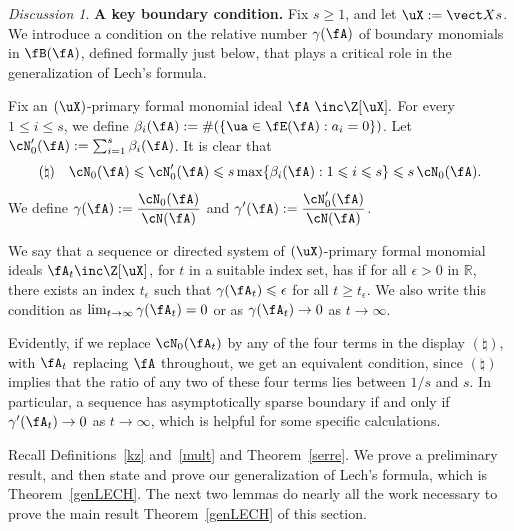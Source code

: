 \documentclass[12pt]{amsart}
\theoremstyle{plain}
\theoremstyle{remark}
\newtheorem{discussion}[theorem]{Discussion}
\theoremstyle{definition}
\numberwithin{equation}{theorem}
\renewcommand{\geq}{\geqslant} \renewcommand{\leq}{\leqslant}
\begin{document}
\begin{discussion}\label{boundary}{\bf A key boundary condition.} 
Fix $s \geq 1$, and let $\uX : = \vect X s$.  We introduce a 
condition on the relative number $\gamma(\fA)$
of boundary monomials in $\fB(\fA)$, defined formally just below,
that plays a critical role in the generalization of Lech's formula. 
\smallskip                                               

Fix an $(\uX)$-primary formal monomial ideal 
$\fA\ \inc \Z[\uX].$  For every $1 \leq i \leq s$, we define 
$\beta_i(\fA) := \#(\{\ua\in \fE(\fA):a_i=0\})$.  
Let $\cN_0'(\fA) := \sum_{i=1}^s \beta_i(\fA)$. It is clear that
\[ (\natural)\quad \cN_0(\fA) \leq \cN_0'(\fA)  
\leq s \max\{\beta_i(\fA): 1 \leq i \leq s\} \leq s\,\cN_0(\fA).\]                           
We define
$\displaystyle  \gamma(\fA) := \frac{\cN_0(\fA)}{\cN(\fA)}$ and
$\displaystyle \gamma'(\fA) := \frac{\cN_0'(\fA)}{\cN(\fA)}$.    

We say that a sequence or directed system of 
$(\uX)$-primary formal monomial ideals $\fA_t \inc \Z[\uX]$, 
for $t$ in a suitable index set, has {\it \asb} if for all 
$\epsilon > 0$ in $\mathbb{R}$, there exists an index $t_{\epsilon}$ 
such that $\gamma(\fA_t) \leq \epsilon$ for
all $t \geq t_{\epsilon}$. We also write this condition as 
$\lim_{t \to \infty} \gamma(\fA_t) = 0$ or as   
$\gamma(\fA_t) \to 0$ as $t \to \infty$.

Evidently, if we replace $\cN_0(\fA_t)$ by any of the four terms in the
display $(\natural)$, with $\fA_t$ replacing $\fA$ throughout, we get 
an equivalent condition, since $(\natural)$ implies that
the ratio of any two of these four terms lies between $1/s$ and $s$. 
In particular, a sequence has asymptotically sparse boundary if and only if
$\gamma'(\fA_t)\to 0$ as $t\to \infty$, which 
is helpful for some specific calculations.
\end{discussion}   

Recall Definitions~\ref{kz} and~\ref{mult} and Theorem~\ref{serre}.  We prove a
preliminary result, and then state and prove our generalization of Lech's 
formula, which is Theorem~\ref{genLECH}.
The next two lemmas do nearly all the work necessary to prove the 
main result Theorem~\ref{genLECH} of this section.
\end{document}
